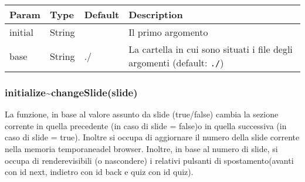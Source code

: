 \begin{longtable}[]{@{}llll@{}}
\toprule
\begin{minipage}[b]{0.22\columnwidth}\raggedright
Param\strut
\end{minipage} & \begin{minipage}[b]{0.22\columnwidth}\raggedright
Type\strut
\end{minipage} & \begin{minipage}[b]{0.22\columnwidth}\raggedright
Default\strut
\end{minipage} & \begin{minipage}[b]{0.22\columnwidth}\raggedright
Description\strut
\end{minipage}\tabularnewline
\midrule
\endhead
\begin{minipage}[t]{0.22\columnwidth}\raggedright
initial\strut
\end{minipage} & \begin{minipage}[t]{0.22\columnwidth}\raggedright
String\strut
\end{minipage} & \begin{minipage}[t]{0.22\columnwidth}\raggedright
\strut
\end{minipage} & \begin{minipage}[t]{0.22\columnwidth}\raggedright
Il primo argomento\strut
\end{minipage}\tabularnewline
\begin{minipage}[t]{0.22\columnwidth}\raggedright
base\strut
\end{minipage} & \begin{minipage}[t]{0.22\columnwidth}\raggedright
String\strut
\end{minipage} & \begin{minipage}[t]{0.22\columnwidth}\raggedright
./\strut
\end{minipage} & \begin{minipage}[t]{0.22\columnwidth}\raggedright
La cartella in cui sono situati i file degli argomenti (default:
\texttt{./})\strut
\end{minipage}\tabularnewline
\bottomrule
\end{longtable}

\hypertarget{initializechangeslideslide}{%
\subsubsection{initialize\textasciitilde{}changeSlide(slide)}\label{initializechangeslideslide}}

La funzione, in base al valore assunto da slide (true/false) cambia la
sezione corrente in quella precedente (in caso di slide = false)o in
quella successiva (in caso di slide = true). Inoltre si occupa di
aggiornare il numero della slide corrente nella memoria temporaneadel
browser. Inoltre, in base al numero di slide, si occupa di
renderevisibili (o nascondere) i relativi pulsanti di spostamento(avanti
con id next, indietro con id back e quiz con id quiz).

